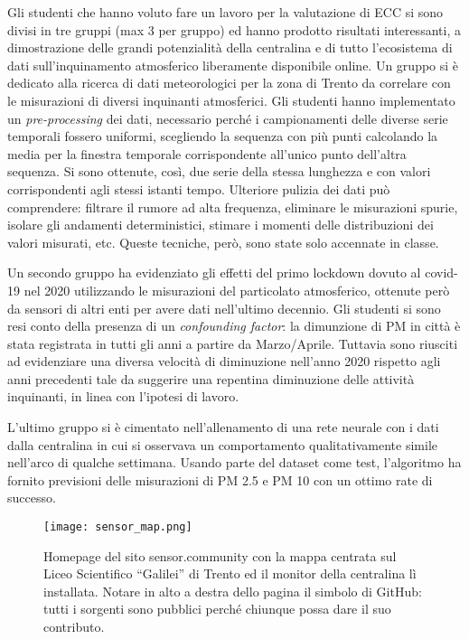 \documentclass{article}
\begin{document}
Gli studenti che hanno voluto fare un lavoro per la valutazione di ECC si sono divisi in tre gruppi (max 3 per gruppo) ed hanno prodotto risultati interessanti, a dimostrazione delle grandi potenzialità della centralina e di tutto l'ecosistema di dati sull'inquinamento atmosferico liberamente disponibile online. Un gruppo si è dedicato alla ricerca di dati meteorologici per la zona di Trento da correlare con le misurazioni di diversi inquinanti atmosferici. Gli studenti hanno implementato un \emph{pre-processing} dei dati, necessario perché i campionamenti delle diverse serie temporali fossero uniformi, scegliendo la sequenza con più punti calcolando la media per la finestra temporale corrispondente all'unico punto dell'altra sequenza. Si sono ottenute, così, due serie della stessa lunghezza e con valori corrispondenti agli stessi istanti tempo. Ulteriore pulizia dei dati può comprendere: filtrare il rumore ad alta frequenza, eliminare le misurazioni spurie, isolare gli andamenti deterministici, stimare i momenti delle distribuzioni dei valori misurati, etc. Queste tecniche, però, sono state solo accennate in classe.

Un secondo gruppo ha evidenziato gli effetti del primo lockdown dovuto al covid-19 nel 2020 utilizzando le misurazioni del particolato atmosferico, ottenute però da sensori di altri enti per avere dati nell'ultimo decennio. Gli studenti si sono resi conto della presenza di un \emph{confounding factor}: la dimunzione di PM in città è stata registrata in tutti gli anni a partire da Marzo/Aprile. Tuttavia sono riusciti ad evidenziare una diversa velocità di diminuzione nell'anno 2020 rispetto agli anni precedenti tale da suggerire una repentina diminuzione delle attività inquinanti, in linea con l'ipotesi di lavoro.

L'ultimo gruppo si è cimentato nell'allenamento di una rete neurale con i dati dalla centralina in cui si osservava un comportamento qualitativamente simile nell'arco di qualche settimana. Usando parte del dataset come test, l'algoritmo ha fornito previsioni delle misurazioni di PM 2.5 e PM 10 con un ottimo rate di successo.

\begin{figure}
\centering
\texttt{[image: sensor\_map.png]}
\label{fig:sensor_map}
\caption{Homepage del sito sensor.community con la mappa centrata sul Liceo Scientifico ``Galilei'' di Trento ed il monitor della centralina lì installata. Notare in alto a destra dello pagina il simbolo di GitHub: tutti i sorgenti sono pubblici perché chiunque possa dare il suo contributo.}
\end{figure}
\end{document}
